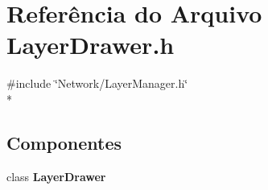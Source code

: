 \section{Referência do Arquivo Layer\+Drawer.\+h}
\label{_layer_drawer_8h}
{\ttfamily \#include \char`\"{}Network/\+Layer\+Manager.\+h\char`\"{}}\\*
\subsection*{Componentes}
\begin{DoxyCompactItemize}
\item 
class {\bf Layer\+Drawer}
\end{DoxyCompactItemize}
